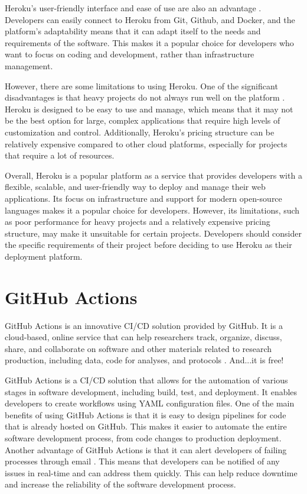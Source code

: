 Heroku's user-friendly interface and ease of use are also an advantage \cite{greengard}. Developers can easily connect to Heroku from Git, Github, and Docker, and the platform's adaptability means that it can adapt itself to the needs and requirements of the software. This makes it a popular choice for developers who want to focus on coding and development, rather than infrastructure management.

However, there are some limitations to using Heroku. One of the significant disadvantages is that heavy projects do not always run well on the platform \cite{greengard}. Heroku is designed to be easy to use and manage, which means that it may not be the best option for large, complex applications that require high levels of customization and control. Additionally, Heroku's pricing structure can be relatively expensive compared to other cloud platforms, especially for projects that require a lot of resources.

Overall, Heroku is a popular platform as a service that provides developers with a flexible, scalable, and user-friendly way to deploy and manage their web applications. Its focus on infrastructure and support for modern open-source languages makes it a popular choice for developers. However, its limitations, such as poor performance for heavy projects and a relatively expensive pricing structure, may make it unsuitable for certain projects. Developers should consider the specific requirements of their project before deciding to use Heroku as their deployment platform.

\section{GitHub Actions}
GitHub Actions is an innovative CI/CD solution provided by GitHub. It is a cloud-based, online service that can help researchers track, organize, discuss, share, and collaborate on software and other materials related to research production, including data, code for analyses, and protocols \cite{ds, kimetal}. And...it is free!

GitHub Actions is a CI/CD solution that allows for the automation of various stages in software development, including build, test, and deployment. It enables developers to create workflows using YAML configuration files. One of the main benefits of using GitHub Actions is that it is easy to design pipelines for code that is already hosted on GitHub. This makes it easier to automate the entire software development process, from code changes to production deployment. Another advantage of GitHub Actions is that it can alert developers of failing processes through email \cite{kimetal}. This means that developers can be notified of any issues in real-time and can address them quickly. This can help reduce downtime and increase the reliability of the software development process.

